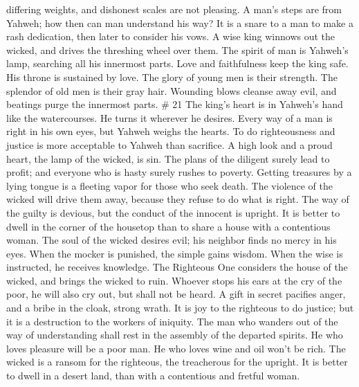 differing weights, and dishonest scales are not pleasing.
 A man's steps are from Yahweh; how then can man
understand his way?  It is a snare to a man to make a
rash dedication, then later to consider his vows.  A wise
king winnows out the wicked, and drives the threshing wheel over them.
 The spirit of man is Yahweh's lamp, searching all his
innermost parts.  Love and faithfulness keep the king
safe. His throne is sustained by love.  The glory of
young men is their strength. The splendor of old men is their gray hair.
 Wounding blows cleanse away evil, and beatings purge the
innermost parts. \# 21  The king's heart is in Yahweh's
hand like the watercourses. He turns it wherever he desires.
 Every way of a man is right in his own eyes, but Yahweh
weighs the hearts.  To do righteousness and justice is
more acceptable to Yahweh than sacrifice.  A high look and
a proud heart, the lamp of the wicked, is sin.  The plans
of the diligent surely lead to profit; and everyone who is hasty surely
rushes to poverty.  Getting treasures by a lying tongue is
a fleeting vapor for those who seek death.  The violence
of the wicked will drive them away, because they refuse to do what is
right.  The way of the guilty is devious, but the conduct
of the innocent is upright.  It is better to dwell in the
corner of the housetop than to share a house with a contentious woman.
 The soul of the wicked desires evil; his neighbor finds
no mercy in his eyes.  When the mocker is punished, the
simple gains wisdom. When the wise is instructed, he receives knowledge.
 The Righteous One considers the house of the wicked, and
brings the wicked to ruin.  Whoever stops his ears at the
cry of the poor, he will also cry out, but shall not be heard.
 A gift in secret pacifies anger, and a bribe in the
cloak, strong wrath.  It is joy to the righteous to do
justice; but it is a destruction to the workers of iniquity.
 The man who wanders out of the way of understanding
shall rest in the assembly of the departed spirits.  He
who loves pleasure will be a poor man. He who loves wine and oil won't
be rich.  The wicked is a ransom for the righteous, the
treacherous for the upright.  It is better to dwell in a
desert land, than with a contentious and fretful woman. 
